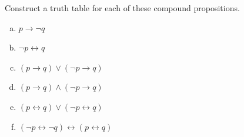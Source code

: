 \documentclass[a4paper,12pt,oneside,article]{memoir}
\begin{document}
\begin{tcolorbox}
	[colback=Emerald!10,colframe=cyan!40!black,title=\textbf{Question 37}]
	Construct a truth table for each of these compound propositions.
	\begin{enumerate}[a)]
		\item $p \rightarrow \lnot q$ 
		\item $\lnot p \leftrightarrow q$
		\item $(p \rightarrow q) \lor (\lnot p \rightarrow q)$
		\item $(p \rightarrow q) \land (\lnot p \rightarrow q)$
		\item $(p \leftrightarrow q) \lor (\lnot p \leftrightarrow q)$
		\item $(\lnot p \leftrightarrow \lnot q) \leftrightarrow (p \leftrightarrow q)$
	\end{enumerate}
\end{tcolorbox}
\end{document}

